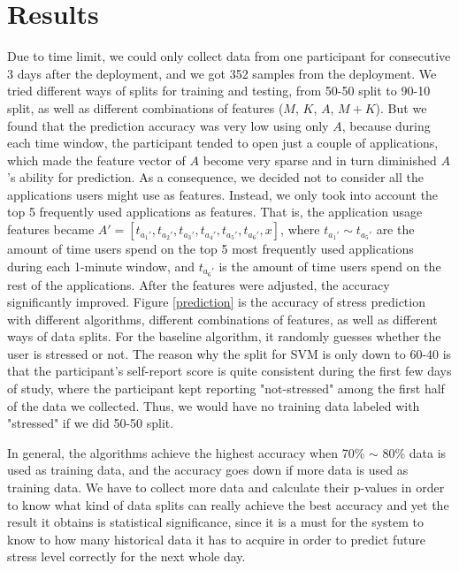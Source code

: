 \documentclass{article}
\begin{document}
\section{Results}
Due to time limit, we could only collect data from one participant for consecutive 3 days after the deployment, and we got 352 samples from the deployment. We tried different ways of splits for training and testing, from 50-50 split to 90-10 split, as well as different combinations of features ($M$, $K$, $A$, $M+K$). But we found that the prediction accuracy was very low using only $A$, because during each time window, the participant tended to open just a couple of applications, which made the feature vector of $A$ become very sparse and in turn diminished $A$'s ability for prediction. As a consequence, we decided not to consider all the applications users might use as features. Instead, we only took into account the top 5 frequently used applications as features. That is, the application usage features became $A'=[t_{a_1'}, t_{a_2'}, t_{a_3'}, t_{a_4'}, t_{a_5'}, t_{a_6'}, x]$, where $t_{a_1'}\sim t_{a_5'}$ are the amount of time users spend on the top 5 most frequently used applications during each 1-minute window, and $t_{a_6'}$ is the amount of time users spend on the rest of the applications. After the features were adjusted, the accuracy significantly improved. Figure \ref{prediction} is the accuracy of stress prediction with different algorithms, different combinations of features, as well as different ways of data splits. For the baseline algorithm, it randomly guesses whether the user is stressed or not. The reason why the split for SVM is only down to 60-40 is that the participant's self-report score is quite consistent during the first few days of study, where the participant kept reporting "not-stressed" among the first half of the data we collected. Thus, we would have no training data labeled with "stressed" if we did 50-50 split.

In general, the algorithms achieve the highest accuracy when 70\% $\sim$ 80\% data is used as training data, and the accuracy goes down if more data is used as training data. We have to collect more data and calculate their p-values in order to know what kind of data splits can really achieve the best accuracy and yet the result it obtains is statistical significance, since it is a must for the system to know to how many historical data it has to acquire in order to predict future stress level correctly for the next whole day. 
\end{document}
